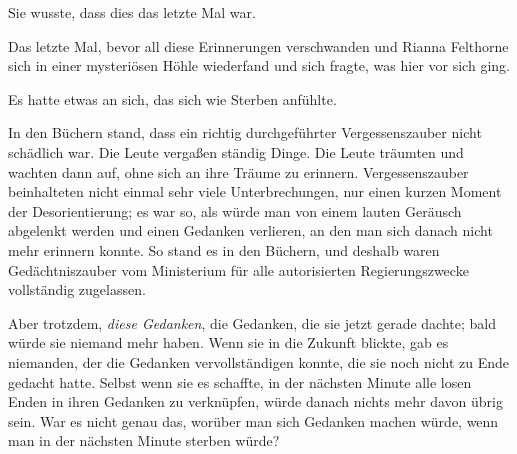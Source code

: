 Sie wusste, dass dies das letzte Mal war.

Das letzte Mal, bevor all diese Erinnerungen verschwanden und Rianna Felthorne sich in einer mysteriösen Höhle wiederfand und sich fragte, was hier vor sich ging.

Es hatte etwas an sich, das sich wie Sterben anfühlte.

In den Büchern stand, dass ein richtig durchgeführter Vergessenszauber nicht schädlich war. Die Leute vergaßen ständig Dinge. Die Leute träumten und wachten dann auf, ohne sich an ihre Träume zu erinnern. Vergessenszauber beinhalteten nicht einmal sehr viele Unterbrechungen, nur einen kurzen Moment der Desorientierung; es war so, als würde man von einem lauten Geräusch abgelenkt werden und einen Gedanken verlieren, an den man sich danach nicht mehr erinnern konnte. So stand es in den Büchern, und deshalb waren Gedächtniszauber vom Ministerium für alle autorisierten Regierungszwecke vollständig zugelassen.

Aber trotzdem, \emph{diese Gedanken}, die Gedanken, die sie jetzt gerade dachte; bald würde sie niemand mehr haben. Wenn sie in die Zukunft blickte, gab es niemanden, der die Gedanken vervollständigen konnte, die sie noch nicht zu Ende gedacht hatte. Selbst wenn sie es schaffte, in der nächsten Minute alle losen Enden in ihren Gedanken zu verknüpfen, würde danach nichts mehr davon übrig sein. War es nicht genau das, worüber man sich Gedanken machen würde, wenn man in der nächsten Minute sterben würde?

